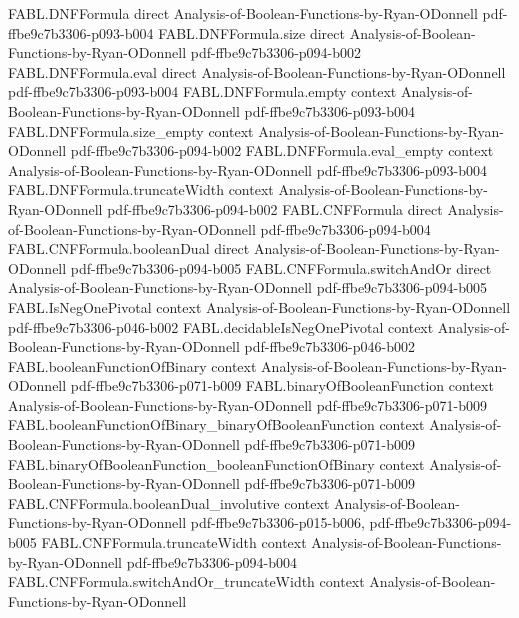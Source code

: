 \begin{theorem}
\proofstep
  {FABL.DNFFormula}
  {direct}
  {Analysis-of-Boolean-Functions-by-Ryan-ODonnell}
  {pdf-ffbe9c7b3306-p093-b004}
\proofstep
  {FABL.DNFFormula.size}
  {direct}
  {Analysis-of-Boolean-Functions-by-Ryan-ODonnell}
  {pdf-ffbe9c7b3306-p094-b002}
\proofstep
  {FABL.DNFFormula.eval}
  {direct}
  {Analysis-of-Boolean-Functions-by-Ryan-ODonnell}
  {pdf-ffbe9c7b3306-p093-b004}
\proofstep
  {FABL.DNFFormula.empty}
  {context}
  {Analysis-of-Boolean-Functions-by-Ryan-ODonnell}
  {pdf-ffbe9c7b3306-p093-b004}
\proofstep
  {FABL.DNFFormula.size_empty}
  {context}
  {Analysis-of-Boolean-Functions-by-Ryan-ODonnell}
  {pdf-ffbe9c7b3306-p094-b002}
\proofstep
  {FABL.DNFFormula.eval_empty}
  {context}
  {Analysis-of-Boolean-Functions-by-Ryan-ODonnell}
  {pdf-ffbe9c7b3306-p093-b004}
\proofstep
  {FABL.DNFFormula.truncateWidth}
  {context}
  {Analysis-of-Boolean-Functions-by-Ryan-ODonnell}
  {pdf-ffbe9c7b3306-p094-b002}
\proofstep
  {FABL.CNFFormula}
  {direct}
  {Analysis-of-Boolean-Functions-by-Ryan-ODonnell}
  {pdf-ffbe9c7b3306-p094-b004}
\proofstep
  {FABL.CNFFormula.booleanDual}
  {direct}
  {Analysis-of-Boolean-Functions-by-Ryan-ODonnell}
  {pdf-ffbe9c7b3306-p094-b005}
\proofstep
  {FABL.CNFFormula.switchAndOr}
  {direct}
  {Analysis-of-Boolean-Functions-by-Ryan-ODonnell}
  {pdf-ffbe9c7b3306-p094-b005}
\proofstep
  {FABL.IsNegOnePivotal}
  {context}
  {Analysis-of-Boolean-Functions-by-Ryan-ODonnell}
  {pdf-ffbe9c7b3306-p046-b002}
\proofstep
  {FABL.decidableIsNegOnePivotal}
  {context}
  {Analysis-of-Boolean-Functions-by-Ryan-ODonnell}
  {pdf-ffbe9c7b3306-p046-b002}
\proofstep
  {FABL.booleanFunctionOfBinary}
  {context}
  {Analysis-of-Boolean-Functions-by-Ryan-ODonnell}
  {pdf-ffbe9c7b3306-p071-b009}
\proofstep
  {FABL.binaryOfBooleanFunction}
  {context}
  {Analysis-of-Boolean-Functions-by-Ryan-ODonnell}
  {pdf-ffbe9c7b3306-p071-b009}
\proofstep
  {FABL.booleanFunctionOfBinary_binaryOfBooleanFunction}
  {context}
  {Analysis-of-Boolean-Functions-by-Ryan-ODonnell}
  {pdf-ffbe9c7b3306-p071-b009}
\proofstep
  {FABL.binaryOfBooleanFunction_booleanFunctionOfBinary}
  {context}
  {Analysis-of-Boolean-Functions-by-Ryan-ODonnell}
  {pdf-ffbe9c7b3306-p071-b009}
\proofstep
  {FABL.CNFFormula.booleanDual_involutive}
  {context}
  {Analysis-of-Boolean-Functions-by-Ryan-ODonnell}
  {pdf-ffbe9c7b3306-p015-b006,
    pdf-ffbe9c7b3306-p094-b005}
\proofstep
  {FABL.CNFFormula.truncateWidth}
  {context}
  {Analysis-of-Boolean-Functions-by-Ryan-ODonnell}
  {pdf-ffbe9c7b3306-p094-b004}
\proofstep
  {FABL.CNFFormula.switchAndOr_truncateWidth}
  {context}
  {Analysis-of-Boolean-Functions-by-Ryan-ODonnell}

\end{theorem}
